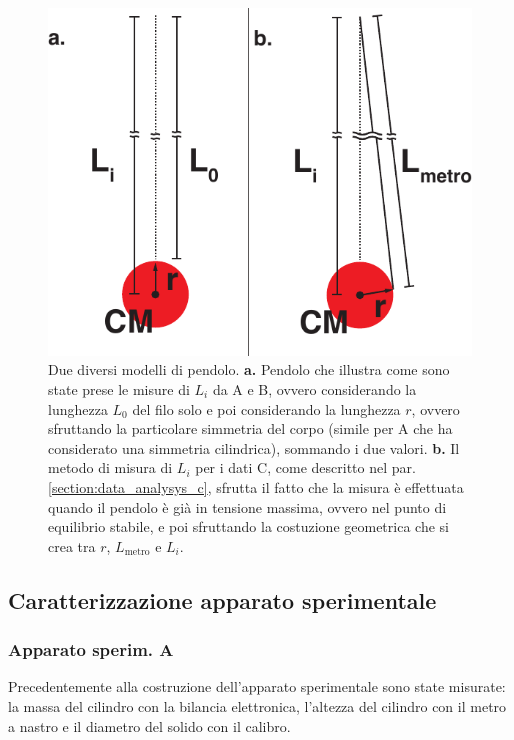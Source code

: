 \documentclass[italian, a4paper, 10pt, twocolumn]{../../style/lab_unige}
\begin{document}
  
  
  \begin{figure}[t!]
    \includegraphics[width=\linewidth]{pendulum_simple.pdf}
    \caption{Due diversi modelli di pendolo. \textbf{a.} Pendolo che illustra come sono state prese le misure di 
    $L_{i}$ da A e B, ovvero considerando la lunghezza $L_{0}$ del filo solo e poi considerando la lunghezza $r$,
    ovvero sfruttando la particolare simmetria del corpo (simile per A che ha considerato una simmetria 
    cilindrica), sommando i due valori. \textbf{b.} Il metodo di misura di $L_{i}$ per i dati C, come descritto
    nel par. \ref{section:data_analysys_c}, sfrutta il fatto che la misura è effettuata quando il pendolo è già
    in tensione massima, ovvero nel punto di equilibrio stabile, e poi sfruttando la costuzione geometrica che si
    crea tra $r$, $L_{\text{metro}}$ e $L_{i}$.}
    \label{fig:pendulum}
  \end{figure}

  \subsection{Caratterizzazione apparato sperimentale}
  \label{section:car_apparato_gen}
  
  \subsubsection{Apparato sperim. A} %
  Precedentemente alla costruzione dell’apparato sperimentale sono state misurate: la massa del cilindro 
  con la bilancia elettronica, l’altezza del cilindro con il metro a nastro e il diametro del solido con 
  il calibro.
\end{document}
